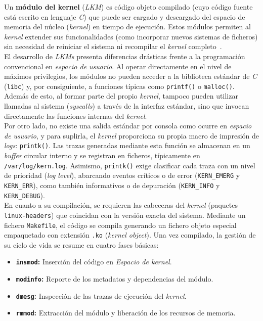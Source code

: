 Un \textbf{módulo del kernel} (\textit{LKM}) es código objeto compilado (cuyo código fuente está escrito en lenguaje \textit{C}) que puede ser cargado y descargado del espacio de memoria del núcleo (\textit{kernel}) en tiempo de ejecución.
Estos módulos permiten al \textit{kernel} extender sus funcionalidades (como incorporar nuevos sistemas de ficheros) sin necesidad de reiniciar el sistema ni recompilar el \textit{kernel} completo~\cite{geeks_lkm}.\\

El desarrollo de \textit{LKMs} presenta diferencias drásticas frente a la programación convencional en \textit{espacio de usuario}.
Al operar directamente en el nivel de máximos privilegios, los módulos no pueden acceder a la biblioteca estándar de \textit{C} (\texttt{libc}) y, por consiguiente, a funciones típicas como \texttt{printf()} o \texttt{malloc()}.
Además de esto, al formar parte del propio \textit{kernel}, tampoco pueden utilizar llamadas al sistema (\textit{syscalls}) a través de la interfaz estándar, sino que invocan directamente las funciones internas del \textit{kernel}.\\

Por otro lado, no existe una salida estándar por consola como ocurre en \textit{espacio de usuario}, y para suplirla, el \textit{kernel} proporciona su propia macro de impresión de \textit{logs}: \texttt{printk()}.
Las trazas generadas mediante esta función se almacenan en un \textit{buffer} circular interno y se registran en ficheros, típicamente en \texttt{/var/log/kern.log}.
Asimismo, \texttt{printk()} exige clasificar cada traza con un nivel de prioridad (\textit{log level}), abarcando eventos críticos o de error (\texttt{KERN\_EMERG} y \texttt{KERN\_ERR}), como también informativos o de depuración (\texttt{KERN\_INFO} y \texttt{KERN\_DEBUG}).\\

En cuanto a su compilación, se requieren las cabeceras del \textit{kernel} (paquetes \texttt{linux-headers}) que coincidan con la versión exacta del sistema.
Mediante un fichero \texttt{Makefile}, el código se compila generando un fichero objeto especial empaquetado con extensión \texttt{.ko} (\textit{kernel object}).
Una vez compilado, la gestión de su ciclo de vida se resume en cuatro fases básicas:

\begin{itemize}
    \item \textbf{\texttt{insmod}:} Inserción del código en \textit{Espacio de kernel}.
    \item \textbf{\texttt{modinfo}:} Reporte de los metadatos y dependencias del módulo.
    \item \textbf{\texttt{dmesg}:} Inspección de las trazas de ejecución del \textit{kernel}.
    \item \textbf{\texttt{rmmod}:} Extracción del módulo y liberación de los recursos de memoria.
\end{itemize}

